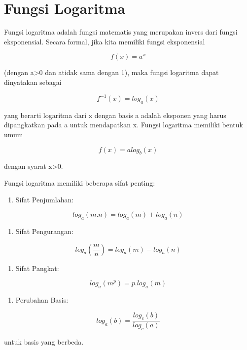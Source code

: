 \documentclass[
]{book}
\providecommand{\tightlist}{%
  \setlength{\itemsep}{0pt}\setlength{\parskip}{0pt}}
\begin{document}
\section{Fungsi Logaritma}\label{fungsi-logaritma}

Fungsi logaritma adalah fungsi matematis yang merupakan invers dari fungsi eksponensial. Secara formal, jika kita memiliki fungsi eksponensial

\[f(x)=a^x\]

(dengan a\textgreater0 dan atidak sama dengan 1), maka fungsi logaritma dapat dinyatakan sebagai

\[f^{-1}(x)=log_a(x)\]

yang berarti logaritma dari x dengan basis a adalah eksponen yang harus dipangkatkan pada a untuk mendapatkan x. Fungsi logaritma memiliki bentuk umum

\[f(x)=a log_b (x)\]

dengan syarat x\textgreater0.

Fungsi logaritma memiliki beberapa sifat penting:

\begin{enumerate}
\def\labelenumi{\arabic{enumi}.}
\tightlist
\item
  Sifat Penjumlahan:
\end{enumerate}

\[log_a (m.n)=log_a(m)+log_a(n)\]

\begin{enumerate}
\def\labelenumi{\arabic{enumi}.}
\setcounter{enumi}{1}
\tightlist
\item
  Sifat Pengurangan:
\end{enumerate}

\[log_a (\frac{m}{n})=log_a(m)-log_a(n)\]

\begin{enumerate}
\def\labelenumi{\arabic{enumi}.}
\setcounter{enumi}{2}
\tightlist
\item
  Sifat Pangkat:
\end{enumerate}

\[log_a(m^p)=p.log_a(m)\]

\begin{enumerate}
\def\labelenumi{\arabic{enumi}.}
\setcounter{enumi}{3}
\tightlist
\item
  Perubahan Basis:
\end{enumerate}

\[log_a(b)=\frac {log_c(b)}{log_c(a)}\]

untuk basis yang berbeda.
\end{document}
